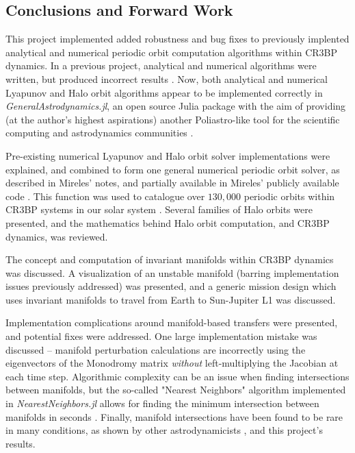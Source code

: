 \documentclass[conf]{new-aiaa}
\begin{document}
\begin{multicols}{2}
\section{Conclusions and Forward Work}
This project implemented added robustness and bug fixes to previously 
implented analytical and numerical periodic orbit computation algorithms
within CR3BP dynamics. In a previous project, analytical and numerical 
algorithms were written, but produced incorrect results \cite{carpinelli2020halos}.
Now, both analytical and numerical Lyapunov and Halo orbit algorithms appear 
to be implemented correctly in \textit{GeneralAstrodynamics.jl}, an 
open source Julia package with the aim of providing (at the author's 
highest aspirations) another Poliastro-like tool for the scientific computing
and astrodynamics communities \cite{carpinelli2020astro}.

Pre-existing numerical Lyapunov and Halo orbit solver implementations
were explained, and 
combined to form one general numerical periodic orbit solver,
as described in Mireles' notes, and partially available in 
Mireles' publicly available code \cite{mirelesNotes} \cite{mirelesCode}.
This function was used to catalogue over $130,000$ periodic orbits within 
CR3BP systems in our solar system \cite{carpinelli2020halos}.
Several families of Halo orbits were presented, and the mathematics
behind Halo orbit computation, and CR3BP dynamics, was reviewed.

The concept and computation of invariant manifolds within CR3BP
dynamics was discussed. A visualization of an unstable manifold 
(barring implementation issues previously addressed) was presented,
and a generic mission design which uses invariant manifolds 
to travel from Earth to Sun-Jupiter L1 was discussed. 

Implementation complications around manifold-based transfers were 
presented, and potential fixes were addressed. One large implementation mistake 
was discussed -- manifold perturbation calculations are incorrectly 
using the eigenvectors of the Monodromy matrix \textit{without} 
left-multiplying the Jacobian at each time step. Algorithmic complexity
can be an issue when finding intersections between manifolds, but the 
so-called "Nearest Neighbors" algorithm implemented in 
\textit{NearestNeighbors.jl} allows for finding the minimum intersection between
manifolds in seconds \cite{nearestNeighbors}. Finally, manifold intersections 
have been found to be rare in many conditions, as shown by other astrodynamicists
\cite{topputo2005low}, and this project's results.


\end{multicols}
\end{document}
